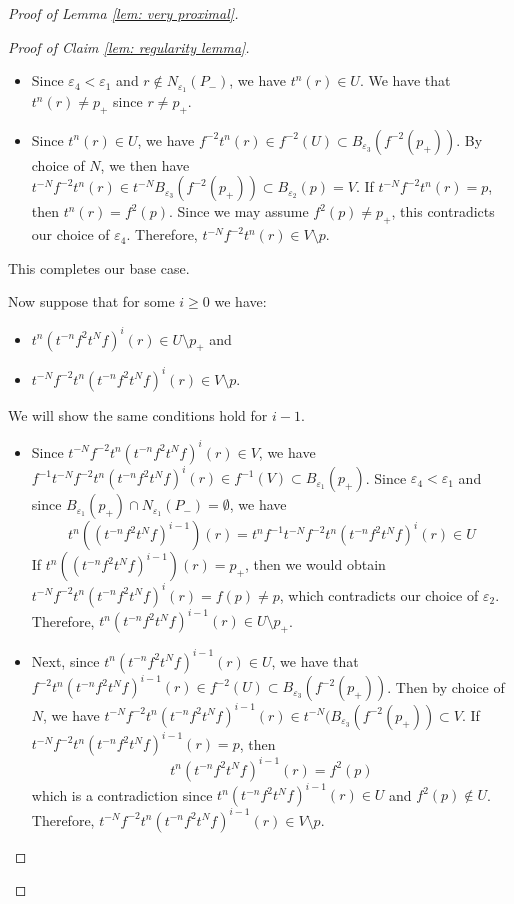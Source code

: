 \documentclass[12pt]{article}
\theoremstyle{definition}
\newcommand{\ve}{\varepsilon}
\begin{document}
\begin{proof} [Proof of Lemma \ref{lem: very proximal}]
\begin{proof}[Proof of Claim \ref{lem: regularity lemma}]
\begin{enumerate}
\begin{enumerate}
\begin{enumerate}
        \begin{itemize}
            \item Since $\ve_4 < \ve_1$ and $r \notin N_{\ve_1}(P_-)$, we have $t^n (r) \in U$. We have that $t^n (r) \neq p_+$ since $r \neq p_+$.
            \item Since $t^n (r) \in U$, we have $f^{-2}t^n (r) \in f^{-2}(U) \subset B_{\ve_3}(f^{-2}(p_+))$. By choice of $N$, we then have $t^{-N}f^{-2}t^n (r) \in t^{-N}B_{\ve_3}(f^{-2}(p_+)) \subset B_{\ve_2}(p) = V$. If $t^{-N}f^{-2}t^n (r) = p$, then $t^n (r) = f^2(p)$. Since we may assume $f^2(p) \neq p_+$, this contradicts our choice of $\ve_4$. Therefore, $t^{-N}f^{-2}t^n (r) \in V \setminus p$.
        \end{itemize}

        This completes our base case. 

        Now suppose that for some $i \geq 0$ we have: 

        \begin{itemize}
            \item $t^n (t^{-n}f^2t^Nf)^{i}(r) \in U \setminus p_+$ and
            \item $t^{-N}f^{-2}t^n (t^{-n}f^2t^Nf)^{i}(r) \in V \setminus p$.
        \end{itemize}

        We will show the same conditions hold for $i - 1$. 

        \begin{itemize}
            \item Since $t^{-N}f^{-2}t^n (t^{-n}f^2t^Nf)^{i}(r) \in V$, we have \newline $f^{-1}t^{-N}f^{-2}t^n (t^{-n}f^2t^Nf)^{i}(r) \in f^{-1}(V) \subset B_{\ve_1}(p_+)$. Since $\ve_4 < \ve_1$ and since $B_{\ve_1}(p_+) \cap N_{\ve_1}(P_-)=\emptyset$, we have $$t^n ((t^{-n}f^2t^Nf)^{i-1})(r) = t^n f^{-1}t^{-N}f^{-2}t^n (t^{-n}f^2t^Nf)^{i}(r) \in U$$ If $t^n ((t^{-n}f^2t^Nf)^{i-1})(r) = p_+$, then we would obtain $t^{-N}f^{-2}t^n (t^{-n}f^2t^Nf)^{i}(r) = f(p) \neq p$, which contradicts our choice of $\ve_2$. Therefore, $t^n (t^{-n}f^2t^Nf)^{i-1}(r) \in U \setminus p_+$.
            \item Next, since $t^n (t^{-n}f^2t^Nf)^{i-1}(r) \in U$, we have that \newline $f^{-2}t^n (t^{-n}f^2t^Nf)^{i-1}(r) \in f^{-2}(U) \subset B_{\ve_3}(f^{-2}(p_+))$. Then by choice of $N$, we have \newline $t^{-N}f^{-2}t^n (t^{-n}f^2t^Nf)^{i-1}(r) \in t^{-N} (B_{\ve_3}(f^{-2}(p_+)) \subset V$. If \newline $t^{-N}f^{-2}t^n (t^{-n}f^2t^Nf)^{i-1}(r) = p$, then $$t^n (t^{-n}f^2t^Nf)^{i-1}(r) = f^2(p)$$ which is a contradiction since $t^n (t^{-n}f^2t^Nf)^{i-1}(r) \in U$ and $f^2(p) \notin U$.   Therefore, $t^{-N}f^{-2}t^n (t^{-n}f^2t^Nf)^{i-1}(r) \in V \setminus p$.
        \end{itemize}


\end{enumerate}
\end{enumerate}
\end{enumerate}
\end{proof}
\end{proof}
\end{document}
